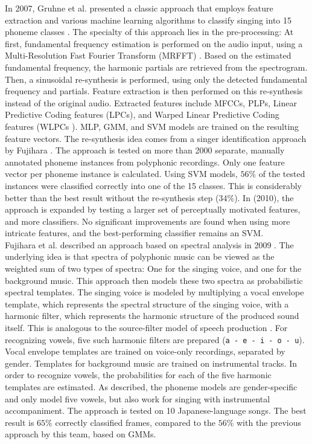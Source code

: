 In 2007, Gruhne et al. presented a classic approach that employs feature extraction and various machine learning algorithms to classify singing into 15 phoneme classes \cite{Gruhne2007} \cite{Gruhne2007a}. The specialty of this approach lies in the pre-processing: At first, fundamental frequency estimation is performed on the audio input, using a Multi-Resolution Fast Fourier Transform (MRFFT) \cite{inproceedings:dressler}. Based on the estimated fundamental frequency, the harmonic partials are retrieved from the spectrogram. Then, a sinusoidal re-synthesis is performed, using only the detected fundamental frequency and partials. Feature extraction is then performed on this re-synthesis instead of the original audio. Extracted features include MFCCs, PLPs, Linear Predictive Coding features (LPCs), and Warped Linear Predictive Coding features (WLPCs \cite{lpc}). MLP, GMM, and SVM models are trained on the resulting feature vectors. The re-synthesis idea comes from a singer identification approach by Fujihara \cite{fujihara_identification}. The approach is tested on more than 2000 separate, manually annotated phoneme instances from polyphonic recordings. Only one feature vector per phoneme instance is calculated. Using SVM models, $56\%$ of the tested instances were classified correctly into one of the 15 classes. This is considerably better than the best result without the re-synthesis step ($34\%$). In \cite{szepannek} (2010), the approach is expanded by testing a larger set of perceptually motivated features, and more classifiers. No significant improvements are found when using more intricate features, and the best-performing classifier remains an SVM.\\

Fujihara et al. described an approach based on spectral analysis in 2009 \cite{fujihara_phonemes}. The underlying idea is that spectra of polyphonic music can be viewed as the weighted sum of two types of spectra: One for the singing voice, and one for the background music. This approach then models these two spectra as probabilistic spectral templates. The singing voice is modeled by multiplying a vocal envelope template, which represents the spectral structure of the singing voice, with a harmonic filter, which represents the harmonic structure of the produced sound itself. This is analogous to the source-filter model of speech production \cite{Fant1981}. For recognizing vowels, five such harmonic filters are prepared (\texttt{a - e - i - o - u}). Vocal envelope templates are trained on voice-only recordings, separated by gender. Templates for background music are trained on instrumental tracks. In order to recognize vowels, the probabilities for each of the five harmonic templates are estimated. 
As described, the phoneme models are gender-specific and only model five vowels, but also work for singing with instrumental accompaniment. The approach is tested on 10 Japanese-language songs. The best result is $65\%$ correctly classified frames, compared to the $56\%$ with the previous approach by this team, based on GMMs.\\

